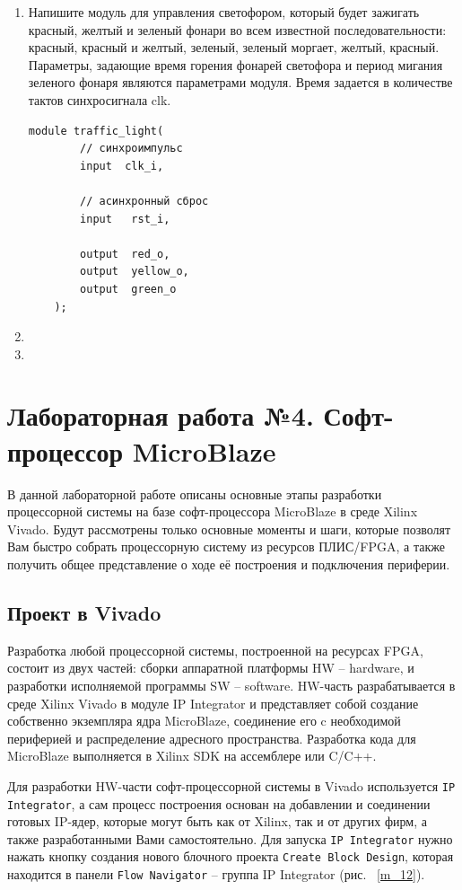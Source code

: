 \documentclass[a4paper,oneside ,14pt]{extreport}
\begin{document}
\begin{enumerate}
	\item Напишите модуль для управления светофором, который будет зажигать красный, желтый и зеленый фонари во всем известной последовательности: красный, красный и желтый, зеленый, зеленый моргает, желтый, красный. Параметры, задающие время горения фонарей светофора и период мигания зеленого фонаря являются параметрами модуля. Время задается в количестве тактов синхросигнала clk.
	\begin{Verbatim}[tabsize=4]
	module traffic_light(
		// cинхроимпульс
	  	input  clk_i,
	
	  	// асинхронный сброс
	  	input   rst_i,
	
	  	output  red_o,
	  	output  yellow_o,
	  	output  green_o
	);
	\end{Verbatim}
	\item 
	\item
\end{enumerate}

\chapter{Лабораторная работа №4. Софт-процессор MicroBlaze}

В данной лабораторной работе описаны основные этапы разработки процессорной системы на 
базе софт-процессора MicroBlaze в среде Xilinx Vivado. Будут рассмотрены
только основные моменты и шаги, которые позволят Вам быстро собрать 
процессорную систему из ресурсов ПЛИС/FPGA, а также получить общее 
представление о ходе её построения и подключения периферии.

\section{Проект в Vivado}

Разработка любой процессорной системы, построенной на ресурсах FPGA,
состоит из двух частей: сборки аппаратной платформы HW – hardware, и разработки исполняемой программы SW – software.
HW-часть разрабатывается в среде Xilinx Vivado в модуле IP Integrator
и представляет собой создание собственно экземпляра ядра MicroBlaze, соединение его c необходимой 
периферией и распределение адресного пространства. Разработка кода для 
MicroBlaze выполняется в Xilinx SDK на ассемблере или C/C++.

Для разработки HW-части софт-процессорной системы в Vivado используется 
\verb|IP Integrator|, а сам процесс построения основан на добавлении и соединении 
готовых IP-ядер, которые могут быть как от Xilinx, так и от других фирм, а также 
разработанными Вами самостоятельно. Для запуска \verb|IP Integrator| нужно нажать 
кнопку создания нового блочного проекта \verb|Create Block Design|, которая находится в 
панели \verb|Flow Navigator| – группа IP Integrator (рис. ~\ref{m_12}).
\end{document}
